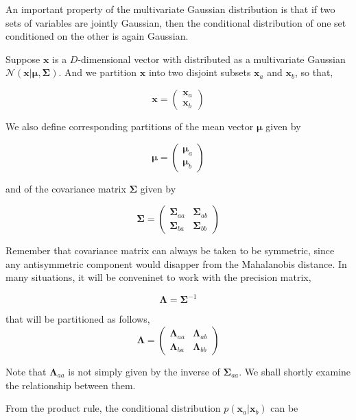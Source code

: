 
An important property of the multivariate Gaussian distribution is that if two sets of variables are jointly Gaussian, then the conditional distribution of one set conditioned on the other is again Gaussian. 

\vspace{0.3cm}

Suppose $\mathbf{x}$ is a $D$-dimensional vector with distributed as a multivariate Gaussian $\mathcal{N}(\mathbf{x}|\bm{\mu},\bm{\Sigma})$.
And we partition $\mathbf{x}$ into two disjoint subsets $\mathbf{x}_a$ and $\mathbf{x}_b$, so that,

\begin{equation}
\mathbf{x} = 
\begin{pmatrix}
 \mathbf{x}_a \\
 \mathbf{x}_b
\end{pmatrix}
\end{equation}

We also define corresponding partitions of the mean vector $\bm{\mu}$ given by


\begin{equation}
\bm{\mu} = 
\begin{pmatrix}
 \bm{\mu}_a \\
 \bm{\mu}_b
\end{pmatrix}
\end{equation}

and of the covariance matrix $\bm{\Sigma}$ given by

\begin{equation}
\bm{\Sigma} = 
\begin{pmatrix}
 \bm{\Sigma}_{aa} & \bm{\Sigma}_{ab} \\
 \bm{\Sigma}_{ba} & \bm{\Sigma}_{bb}
\end{pmatrix}
\end{equation}

Remember that covariance matrix can always be taken to be symmetric, since any antisymmetric component would disapper from the Mahalanobis distance.
In many situations, it will be conveninet to work with the precision matrix,

\begin{equation}
 \bm{\Lambda} = \bm{\Sigma}^{-1}
\end{equation}

that will be partitioned as follows,
\begin{equation}
\bm{\Lambda} = 
\begin{pmatrix}
 \bm{\Lambda}_{aa} & \bm{\Lambda}_{ab} \\
 \bm{\Lambda}_{ba} & \bm{\Lambda}_{bb}
\end{pmatrix}
\end{equation}

Note that $\bm{\Lambda}_{aa}$ is not simply given by the inverse of $\bm{\Sigma}_{aa}$.
We shall shortly examine the relationship between them.

\vspace{0.3cm}

From the product rule, the conditional distribution $p(\mathbf{x}_a|\mathbf{x}_b)$ can be 
